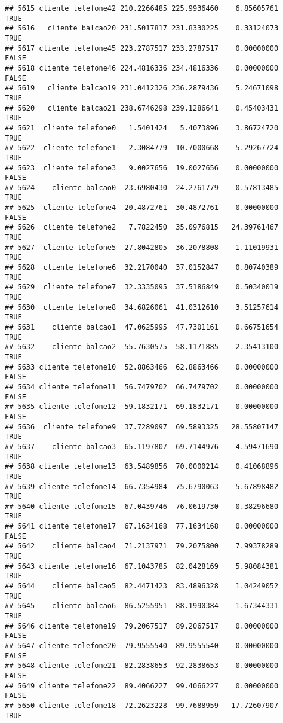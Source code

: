 \documentclass[
]{article}
\begin{document}
\begin{verbatim}
## 5615 cliente telefone42 210.2266485 225.9936460    6.85605761     TRUE
## 5616   cliente balcao20 231.5017817 231.8330225    0.33124073     TRUE
## 5617 cliente telefone45 223.2787517 233.2787517    0.00000000    FALSE
## 5618 cliente telefone46 224.4816336 234.4816336    0.00000000    FALSE
## 5619   cliente balcao19 231.0412326 236.2879436    5.24671098     TRUE
## 5620   cliente balcao21 238.6746298 239.1286641    0.45403431     TRUE
## 5621  cliente telefone0   1.5401424   5.4073896    3.86724720     TRUE
## 5622  cliente telefone1   2.3084779  10.7000668    5.29267724     TRUE
## 5623  cliente telefone3   9.0027656  19.0027656    0.00000000    FALSE
## 5624    cliente balcao0  23.6980430  24.2761779    0.57813485     TRUE
## 5625  cliente telefone4  20.4872761  30.4872761    0.00000000    FALSE
## 5626  cliente telefone2   7.7822450  35.0976815   24.39761467     TRUE
## 5627  cliente telefone5  27.8042805  36.2078808    1.11019931     TRUE
## 5628  cliente telefone6  32.2170040  37.0152847    0.80740389     TRUE
## 5629  cliente telefone7  32.3335095  37.5186849    0.50340019     TRUE
## 5630  cliente telefone8  34.6826061  41.0312610    3.51257614     TRUE
## 5631    cliente balcao1  47.0625995  47.7301161    0.66751654     TRUE
## 5632    cliente balcao2  55.7630575  58.1171885    2.35413100     TRUE
## 5633 cliente telefone10  52.8863466  62.8863466    0.00000000    FALSE
## 5634 cliente telefone11  56.7479702  66.7479702    0.00000000    FALSE
## 5635 cliente telefone12  59.1832171  69.1832171    0.00000000    FALSE
## 5636  cliente telefone9  37.7289097  69.5893325   28.55807147     TRUE
## 5637    cliente balcao3  65.1197807  69.7144976    4.59471690     TRUE
## 5638 cliente telefone13  63.5489856  70.0000214    0.41068896     TRUE
## 5639 cliente telefone14  66.7354984  75.6790063    5.67898482     TRUE
## 5640 cliente telefone15  67.0439746  76.0619730    0.38296680     TRUE
## 5641 cliente telefone17  67.1634168  77.1634168    0.00000000    FALSE
## 5642    cliente balcao4  71.2137971  79.2075800    7.99378289     TRUE
## 5643 cliente telefone16  67.1043785  82.0428169    5.98084381     TRUE
## 5644    cliente balcao5  82.4471423  83.4896328    1.04249052     TRUE
## 5645    cliente balcao6  86.5255951  88.1990384    1.67344331     TRUE
## 5646 cliente telefone19  79.2067517  89.2067517    0.00000000    FALSE
## 5647 cliente telefone20  79.9555540  89.9555540    0.00000000    FALSE
## 5648 cliente telefone21  82.2838653  92.2838653    0.00000000    FALSE
## 5649 cliente telefone22  89.4066227  99.4066227    0.00000000    FALSE
## 5650 cliente telefone18  72.2623228  99.7688959   17.72607907     TRUE

\end{verbatim}
\end{document}
